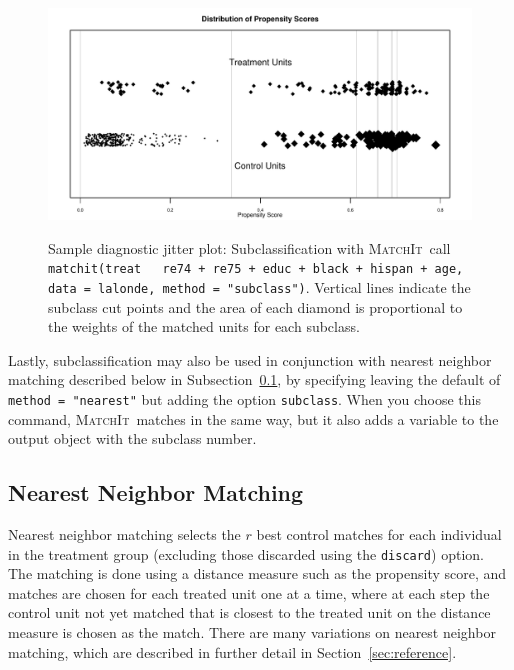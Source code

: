 \documentclass[oneside,letterpaper,titlepage]{article}
\newcommand{\MatchIt}{\textsc{MatchIt}}
\begin{document}
\begin{figure}[tbp]
  \begin{center}
    {\includegraphics[scale=0.7]{figs/jitterplotsub}}
    \hfill
    \caption{Sample diagnostic jitter plot: Subclassification with
      \MatchIt\ call \texttt{matchit(treat ~ re74 + re75 + educ +
        black + hispan + age, data = lalonde, method = "subclass")}.
      Vertical lines indicate the subclass cut points and the area of
      each diamond is proportional to the weights of the matched units
      for each subclass.}
\label{diagjittersub}
\end{center}
\end{figure}

Lastly, subclassification may also be used in conjunction with nearest
neighbor matching described below in Subsection~\ref{nearest}, by
specifying leaving the default of \texttt{method = "nearest"} but
adding the option \texttt{subclass}.  When you choose this command,
\MatchIt\ matches in the same way, but it also adds a variable to the
output object with the subclass number.

\subsection{Nearest Neighbor Matching}
\label{nearest}

Nearest neighbor matching selects the $r$ best control matches for
each individual in the treatment group (excluding those discarded
using the \texttt{discard}) option.  The matching is done using a
distance measure such as the propensity score, and matches are chosen
for each treated unit one at a time, where at each step the control
unit not yet matched that is closest to the treated unit on the
distance measure is chosen as the match.  There are many variations on
nearest neighbor matching, which are described in further detail in
Section~\ref{sec:reference}. 
\end{document}
